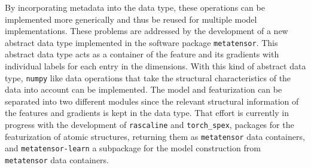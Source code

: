 By incorporating metadata into the data type, these operations can be implemented more generically and thus be reused for multiple model implementations.
These problems are addressed by the development of a new abstract data type implemented in the software package \texttt{metatensor}.
This abstract data type acts as a container of the feature and its gradients with individual labels for each entry in the dimensions.
With this kind of abstract data type, \texttt{numpy} like data operations that take the structural characteristics of the data into account can be implemented.
The model and featurization can be separated into two different modules since the relevant structural information of the features and gradients is kept in the data type.
That effort is currently in progress with the development of \texttt{rascaline} and \texttt{torch\_spex}, packages for the featurization of atomic structures, returning them as \texttt{metatensor} data containers, and \texttt{metatensor-learn} a subpackage for the model construction from \texttt{metatensor} data containers.


